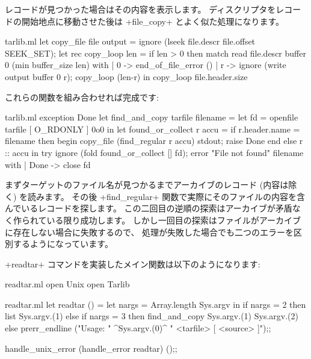 レコードが見つかった場合はその内容を表示します。
ディスクリプタをレコードの開始地点に移動させた後は \ml+file_copy+ とよく似た処理になります。
\begin{listingcodefile}{tarlib.ml}
let copy_file file output =
  ignore (lseek file.descr file.offset SEEK_SET);
  let rec copy_loop len =
    if len > 0 then
      match read file.descr buffer 0 (min buffer_size len) with
      | 0 -> end_of_file_error ()
      | r -> ignore (write output buffer 0 r); copy_loop (len-r) in
  copy_loop file.header.size
\end{listingcodefile}
これらの関数を組み合わせれば完成です:
\begin{listingcodefile}{tarlib.ml}
exception Done
let find_and_copy tarfile filename =
  let fd = openfile tarfile [ O_RDONLY ] 0o0 in
  let found_or_collect r accu =
    if r.header.name = filename then begin
      copy_file (find_regular r accu) stdout;
      raise Done
    end else r :: accu in
  try
     ignore (fold found_or_collect [] fd);
     error "File not found" filename
  with
  | Done -> close fd
\end{listingcodefile}
まずターゲットのファイル名が見つかるまでアーカイブのレコード (内容は除く) を読みます。
その後 \ml+find_regular+ 関数で実際にそのファイルの内容を含んでいるレコードを探します。
この二回目の逆順の探索はアーカイブが矛盾なく作られている限り成功します。
しかし一回目の探索はファイルがアーカイブに存在しない場合に失敗するので、
処理が失敗した場合でも二つのエラーを区別するようになっています。

\ml+readtar+ コマンドを実装したメイン関数は以下のようになります:
\begin{codefile}{readtar.ml}
open Unix
open Tarlib
\end{codefile}
\begin{listingcodefile}{readtar.ml}
let readtar () =
  let nargs = Array.length Sys.argv in
  if nargs = 2 then list Sys.argv.(1)
  else if nargs = 3 then find_and_copy Sys.argv.(1) Sys.argv.(2)
  else
    prerr_endline ("Usage: " ^Sys.argv.(0)^ " <tarfile> [ <source> ]");;

handle_unix_error (handle_error readtar) ();;
\end{listingcodefile}

